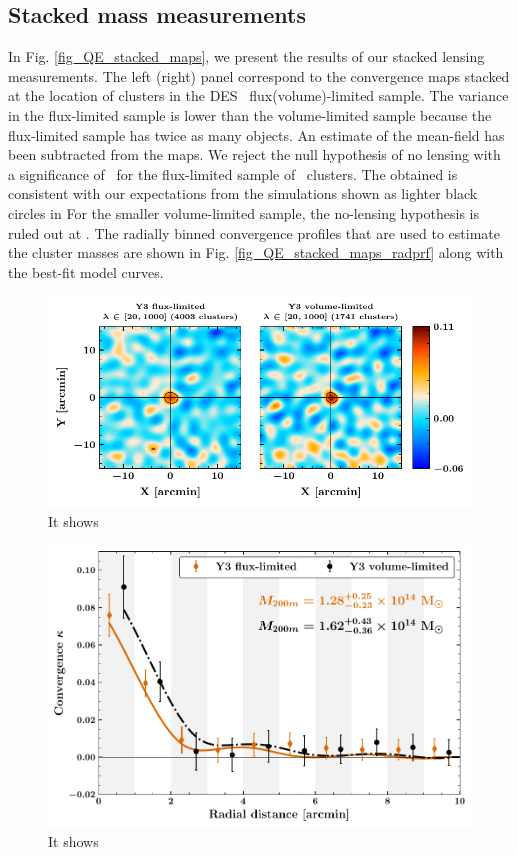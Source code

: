 \subsection{Stacked mass measurements}
\label{sec_temp_results}
In Fig. \ref{fig_QE_stacked_maps}, we present the results of our stacked lensing measurements. 
The left (right) panel correspond to the convergence maps stacked at the location of clusters in the DES \whichyear\ flux(volume)-limited sample.
The variance in the flux-limited sample is lower than the volume-limited sample because the flux-limited sample has twice as many objects. 
An estimate of the mean-field has been subtracted from the maps.
We reject the null hypothesis of no lensing with a significance of \howmanysigmaforfullsample\ for the flux-limited sample of \howmanyclustersinfullsample\ clusters. 
The obtained \snr{} is consistent with our expectations from the simulations shown as lighter black circles in %
For the smaller volume-limited sample, the no-lensing hypothesis is ruled out at  \howmanysigmaforcosmosample.
The radially binned convergence profiles that are used to estimate the cluster masses are shown in Fig. \ref{fig_QE_stacked_maps_radprf} along with the best-fit model curves. 
\begin{figure}
\includegraphics[width=\linewidth]{figs/kappa_model_MF_y3_v6_4_22_full_vl_JODY.pdf}
\caption{It shows}
\label{fig:fig_QE_stacked_maps}
\end{figure}

\begin{figure}
\includegraphics[width=\linewidth]{figs/kappa_model_MF_y3_v6_4_22_full_vl_radprf_JODY.pdf}
\caption{It shows}
\label{fig:fig_QE_stacked_maps}
\end{figure}

